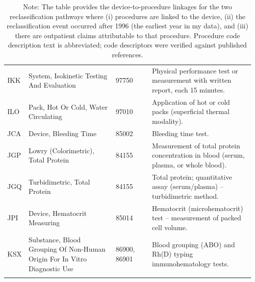 \documentclass[letterpaper,12pt]{article}
\theoremstyle{definition}
\begin{document}
\begin{table}[h!]
\begin{center}
{\begin{tabular}{l p{6.0cm} p{2.6cm} p{2.6cm} p{7.8cm}}
IKK & System, Isokinetic Testing And Evaluation & 97750 &  & Physical performance test or measurement with written report, each 15 minutes. \\
ILO & Pack, Hot Or Cold, Water Circulating & 97010 &  & Application of hot or cold packs (superficial thermal modality). \\
JCA & Device, Bleeding Time & 85002 &  & Bleeding time test. \\
JGP & Lowry (Colorimetric), Total Protein & 84155 &  & Measurement of total protein concentration in blood (serum, plasma, or whole blood). \\
JGQ & Turbidimetric, Total Protein & 84155 &  & Total protein; quantitative assay (serum/plasma) -- turbidimetric method. \\
JPI & Device, Hematocrit Measuring & 85014 &  & Hematocrit (microhematocrit) test -- measurement of packed cell volume. \\
KSX & Substance, Blood Grouping Of Non-Human Origin For In Vitro Diagnostic Use & 86900, 86901 &  & Blood grouping (ABO) and Rh(D) typing immunohematology tests. \\
\\
\bottomrule
\end{tabular}}
\caption*{\footnotesize Note: The table provides the device-to-procedure linkages for the two reclassification pathways where (i) procedures are linked to the device, (ii) the reclassification event occurred after 1996 (the earliest year in my data), and (iii) there are outpatient claims attributable to that procedure. Procedure code description text is abbreviated; code descriptors were verified against published references.}
\label{tab:DeviceToProcedureLinkages}
\end{center}
\end{table}

\clearpage
\newpage
\end{document}

